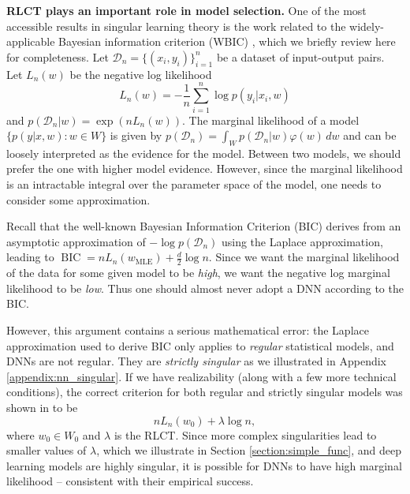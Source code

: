 \documentclass{article} %
\begin{document}
\textbf{RLCT plays an important role in model selection.}
One of the most accessible results in singular learning theory is the work related to the widely-applicable Bayesian information criterion (WBIC) \citet{watanabe_widely_2013}, which we briefly review here for completeness.
Let $\mathcal D_n =  \{(x_i,y_i)\}_{i=1}^n$ be a dataset of input-output pairs.  
Let $L_n(w)$ be the negative log likelihood
\begin{equation}
L_n(w) = -\frac{1}{n} \sum_{i=1}^n \log p(y_i |x_i, w)
\label{eq:nll}
\end{equation}
and $p(\mathcal D_n | w) = \exp( n L_n(w)).$
The marginal likelihood of a model $\{p(y|x,w): w \in W\}$ is given by
$
p(\mathcal D_n) = \int_W p(\mathcal D_n|w) \varphi(w) \,dw
$
and can be loosely interpreted as the evidence for the model. Between two models, we should prefer the one with higher model evidence. However, since the marginal likelihood is an intractable integral over the parameter space of the model, one needs to consider some approximation.

Recall that the well-known Bayesian Information Criterion (BIC) derives from an asymptotic approximation of $-\log p(\mathcal D_n)$ using the Laplace approximation, leading to
$
\operatorname{BIC} = nL_n( w_{\operatorname{MLE}}) + \frac{d}{2} \log n.
$
Since we want the marginal likelihood of the data for some given model to be \textit{high}, we want the negative log marginal likelihood to be \textit{low}. Thus one should almost never adopt a DNN according to the BIC. 

However, this argument contains a serious mathematical error: the Laplace approximation used to derive BIC only applies to \emph{regular} statistical models, and DNNs are not regular. They are \textit{strictly singular} as we illustrated in Appendix \ref{appendix:nn_singular}. 
If we have realizability (along with a few more technical conditions), the correct criterion for both regular and strictly singular models was shown in \citet{watanabe_widely_2013} to be 
$$
nL_n(w_0) + \lambda \log n,
$$
where $w_0 \in W_0$ and $\lambda$ is the RLCT. 
Since more complex singularities lead to smaller values of $\lambda$, which we illustrate in Section \ref{section:simple_func}, and deep learning models are highly singular, it is possible for DNNs to have high marginal likelihood -- consistent with their empirical success. 
\end{document}
